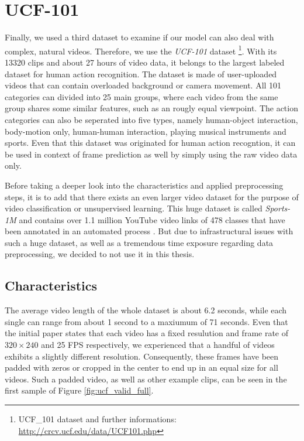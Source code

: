 \section{UCF-101} \label{sec:ds_ucf}

Finally, we used a third dataset to examine if our model can also deal with complex, natural videos. Therefore, we use the \textit{UCF-101} dataset \parencite{ucf}\footnote{UCF_101 dataset and further informations: \url{http://crcv.ucf.edu/data/UCF101.php}}. With its \num{13320} clips and about \num{27} hours of video data, it belongs to the largest labeled dataset for human action recognition. The dataset is made of user-uploaded videos that can contain overloaded background or camera movement. All \num{101} categories can divided into \num{25} main groups,  where each video from the same group shares some similar features, such as an rougly equal viewpoint. The action categories can also be seperated into five types, namely human-object interaction, body-motion only, human-human interaction, playing musical instruments and sports. Even that this dataset was originated for human action recogntion, it can be used in context of frame prediction as well by simply using the raw video data only.

Before taking a deeper look into the characteristics and applied preprocessing steps, it is to add that there exists an even larger video dataset for the purpose of video classification or unsupervised learning. This huge dataset is called \textit{Sports-1M} and contains over \num{1.1} million YouTube video links of \num{478} classes that have been annotated in an automated process \parencite{large_video_class}. But due to infrastructural issues with such a huge dataset, as well as a tremendous time exposure regarding data preprocessing, we decided to not use it in this thesis.


\subsection{Characteristics}

The average video length of the whole dataset is about \num{6.2} seconds, while each single can range from about \num{1} second to a maxiumum of \num{71} seconds. Even that the initial paper states that each video has a fixed resulution and frame rate of $ 320 \times 240 $ and \num{25} FPS respectively, we experienced that a handful of videos exhibits a slightly different resolution. Consequently, these frames have been padded with zeros or cropped in the center to end up in an equal size for all videos. Such a padded video, as well as other example clips, can be seen in the first sample of Figure \ref{fig:ucf_valid_full}.

